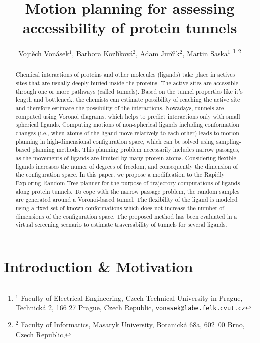 \documentclass[usletter, 10pt, conference]{ieeeconf} %
\title{Motion planning for assessing accessibility of protein tunnels}
\author{Vojt\v ech Von\' asek$^{1}$,
    Barbora Kozl\'\i kov\'a$^{2}$,
    Adam Jur\v{c}\'\i k$^{2}$,
    Martin Saska$^{1}$
\thanks{$^{1}$ Faculty of Electrical Engineering,  Czech Technical University in Prague, 
Technick\'a 2, 166 27 Prague, Czech Republic,
{\tt vonasek@labe.felk.cvut.cz}}
\thanks{$^{2}$        
Faculty of Informatics,   Masaryk University, Botanick\'a 68a, 602~00 Brno, Czech Republic,
}
}
\begin{document}
\maketitle
\thispagestyle{empty}
\pagestyle{empty}

\begin{abstract}
Chemical interactions of proteins and other molecules (ligands) take place in actives sites that are usually deeply buried inside the proteins.
The active sites are accessible through one or more pathways (called tunnels).
Based on the tunnel properties like it's length and bottleneck, the chemists can estimate possibility of reaching the active site and therefore estimate the possibility of the interactions.
Nowadays, tunnels are computed using Voronoi diagrams, which helps to predict interactions only with small spherical ligands.
Computing motions of non-spherical ligands including conformation changes (i.e., when atoms of the ligand move relatively to each other) leads to motion planning in high-dimensional configuration space, which can be solved using sampling-based planning methods.
This planning problem necessarily includes narrow passages, as the movements of ligands are limited by many protein atoms.
Considering flexible ligands increases the numer of degrees of freedom, and consequently the dimension of the configuration space.
In this paper, we propose a modification to the Rapidly Exploring Random Tree planner for the purpose of trajectory computations of ligands along protein tunnels.
To cope with the narrow passage problem, the random samples are generated around a Voronoi-based tunnel.
The flexibility of the ligand is modeled using a fixed set of known conformations which does not increase the number of dimensions of the configuration space.
The proposed method has been evaluated in a virtual screening scenario to estimate traversability of tunnels for several ligands.
\end{abstract}


\section{Introduction \& Motivation}
\end{document}
